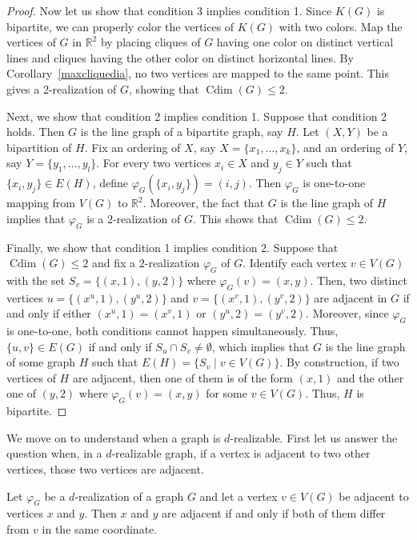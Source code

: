 \documentclass[12pt,a4paper,titlepage,openany]{report}
\DeclareMathOperator{\Cdim}{Cdim}
\begin{document}
\begin{proof}
\medskip
Now let us show that condition 3 implies condition 1.
Since $K(G)$ is bipartite, we can properly color the vertices of $K(G)$ with two colors. Map the vertices of $G$ in $\mathbb{R}^2$ by placing cliques of $G$ having one color on distinct vertical lines and cliques having the other color on distinct horizontal lines. By Corollary~\ref{maxcliquedia}, no two vertices are mapped to the same point. This gives a 2-realization of $G$, showing that $\Cdim(G)\leq 2$.

\medskip

Next, we show that condition 2 implies condition 1. Suppose that condition 2 holds. Then $G$ is the line graph of a bipartite graph, say $H$. Let $(X,Y)$ be a bipartition of $H$. Fix an ordering of $X$, say $X = \{x_1,\ldots, x_k\}$, and
an ordering of $Y$, say $Y = \{y_1,\ldots, y_l\}$. For every two vertices $x_i\in X$ and $y_j\in Y$ such that $\{x_i,y_j\}\in E(H)$,
define $\varphi_G(\{x_i,y_j\}) = (i,j)$. Then $\varphi_G$ is one-to-one mapping from $V(G)$ to $\mathbb{R}^2$. Moreover, the fact that $G$ is the line graph of $H$ implies that $\varphi_G$ is a $2$-realization of $G$. This shows that $\Cdim(G)\leq 2$.

Finally, we show that condition 1 implies condition 2. Suppose that $\Cdim(G)\leq 2$ and fix a $2$-realization $\varphi_G$ of $G$.
Identify each vertex $v\in V(G)$ with the set $S_v = \{(x,1),(y,2)\}$ where $\varphi_G(v) = (x,y)$.
Then, two distinct vertices
$u = \{(x^u,1),(y^u,2)\}$
and
$v = \{(x^v,1),(y^v,2)\}$ are adjacent in $G$ if and only if either $(x^u,1) = (x^v,1)$ or
$(y^u,2) = (y^v,2)$. Moreover, since $\varphi_G$ is one-to-one, both conditions cannot happen simultaneously.
Thus, $\{u,v\}\in E(G)$ if and only if $S_u\cap S_v\neq \emptyset$, which implies that $G$ is the line graph of some graph $H$ such that $E(H) = \{S_v\mid v\in V(G)\}$. By construction, if two vertices of $H$ are adjacent, then one of them is of the form $(x,1)$ and the other one of $(y,2)$ where $\varphi_G(v) = (x,y)$ for some $v\in V(G)$. Thus, $H$ is bipartite.
\end{proof}

We move on to understand when a graph is $d$-realizable. First let us answer the question when, in a $d$-realizable graph, if a vertex is adjacent to two other vertices, those two vertices are adjacent.

\begin{lemma}\label{xyv adjacent}
Let $\varphi_G$ be a $d$-realization of a graph $G$ and let a vertex $v\in V(G)$ be adjacent to vertices $x$ and $y$. Then $x$ and $y$ are adjacent if and only if both of them differ from $v$ in the same coordinate.
\end{lemma}
\end{document}
